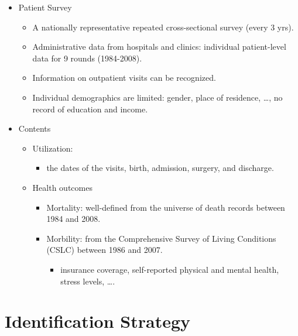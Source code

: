 \documentclass[../root]{subfiles}
\begin{document}
    \begin{itemize}
      \item Patient Survey
      \begin{itemize}
        \item A nationally representative repeated cross-sectional survey (every 3 yrs).
        \item Administrative data from hospitals and clinics: individual patient-level data for 9 rounds (1984-2008).
        \item Information on outpatient visits can be recognized.
        \item Individual demographics are limited: gender, place of residence, \ldots, no record of education and income.
      \end{itemize}
      \item Contents
      \begin{itemize}
        \item Utilization:
        \begin{itemize}
          \item the dates of the visits, birth, admission, surgery, and discharge.
        \end{itemize}
        \item Health outcomes
        \begin{itemize}
          \item Mortality: well-defined from the universe of death records between 1984 and 2008.
          \item Morbility: from the Comprehensive Survey of Living Conditions (CSLC) between 1986 and 2007.
          \begin{itemize}
            \item insurance coverage, self-reported physical and mental health, stress levels, \ldots.
          \end{itemize}
        \end{itemize}
      \end{itemize}
    \end{itemize}

    \section{Identification Strategy}
\end{document}
